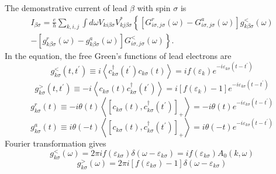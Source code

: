 \documentclass[11pt,a4paper]{book}
\begin{document}
The demonstrative current of lead $\beta$ with spin $\sigma$ is~\cite{CaoZhan}
\begin{equation}
\begin{array}{r}
I_{\beta \sigma}=\frac{e}{h} \sum_{k, i, j} \int d \omega V_{k i \beta \sigma} V_{k j \beta \sigma}^{*}\left\{\left[G_{i \sigma, j \sigma}^{r}(\omega)-G_{i \sigma, j \sigma}^{a}(\omega)\right] g_{k \beta \sigma}^{<}(\omega)\right. \\
\left.-\left[g_{k \beta \sigma}^{r}(\omega)-g_{k \beta \sigma}^{a}(\omega)\right] G_{i \sigma, j \sigma}^{<}(\omega)\right\}.
\end{array}
\end{equation}
In the equation, the free Green's functions of lead electrons are
\begin{equation}
g_{k \sigma}^{<}\left(t, t^{\prime}\right) \equiv i\left\langle c_{k \sigma}^{\dagger}\left(t^{\prime}\right) c_{k \sigma}(t)\right\rangle=i f\left(\varepsilon_{k}\right) e^{-i \varepsilon_{k\sigma}\left(t-t^{\prime}\right)}
\end{equation}
\begin{equation}
g_{k \sigma}^{>}\left(t, t^{\prime}\right) \equiv-i\left\langle c_{k \sigma}(t) c_{k \sigma}^{\dagger}\left(t^{\prime}\right)\right\rangle=i\left[f\left(\varepsilon_{k}\right)-1\right] e^{-i \varepsilon_{k\sigma}\left(t-t^{\prime}\right)}
\end{equation}
\begin{equation}
g_{k \sigma}^{r}(t) \equiv-i \theta(t)\left\langle\left[c_{k \sigma}(t), c_{k \sigma}^{\dagger}\left(t^{\prime}\right)\right]_{+}\right\rangle=-i \theta(t) e^{-i \varepsilon_{k\sigma}\left(t-t^{\prime}\right)}
\end{equation}
\begin{equation}
g_{k \sigma}^{a}(t) \equiv i \theta(-t)\left\langle\left[c_{k \sigma}(t), c_{k \sigma}^{\dagger}\left(t^{\prime}\right)\right]_{+}\right\rangle=i \theta(-t) e^{-i \varepsilon_{k\sigma}\left(t-t^{\prime}\right)}
\end{equation}
Fourier transformation gives
\begin{equation}
g_{k \sigma}^{<}(\omega)=2 \pi i f\left(\varepsilon_{k\sigma}\right) \delta\left(\omega-\varepsilon_{k\sigma}\right) = if \left( \varepsilon_{k\sigma} \right) A_{0}(k,\omega)
\end{equation}
\begin{equation}
g_{k \sigma}^{>}(\omega)=2 \pi i\left[f\left(\varepsilon_{k\sigma}\right)-1\right] \delta\left(\omega-\varepsilon_{k\sigma}\right)
\end{equation}
\end{document}
